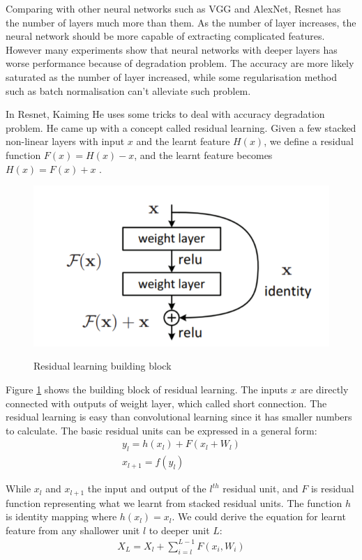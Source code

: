 \documentclass{article}
\begin{document}
Comparing with other neural networks such as VGG and AlexNet, Resnet has the number of layers much more than them. As the number of layer increases, the neural network should be more capable of extracting complicated features. However many experiments show that neural networks with deeper layers has worse performance because of degradation problem. The accuracy are more likely saturated as the number of layer increased, while some regularisation method such as batch normalisation can't alleviate such problem.

In Resnet, Kaiming He uses some tricks to deal with accuracy degradation problem. He came up with a concept called residual learning. Given a few stacked non-linear layers with input $x$ and the learnt feature $H(x)$, we define a residual function $F(x)=H(x)-x$, and the learnt feature becomes $H(x)=F(x)+x$ \citep{ResnetReview}.

\begin{figure}[htp]
    \centering
    \includegraphics[width=\columnwidth]{figures/Residual learning.png}
    \caption{Residual learning building block}
    \label{fig:Residual learning}\citep{Resnet}
\end{figure}

Figure \ref{fig:Residual learning} shows the building block of residual learning. The inputs $x$ are directly connected with outputs of weight layer, which called short connection. The residual learning is easy than convolutional learning since it has smaller numbers to calculate. The basic residual units can be expressed in a general form:
\begin{align}
    y_l=h(x_l)+F(x_l+W_l)\\
    x_{l+1}=f(y_l)
\end{align}

While $x_l$ and $x_{l+1}$ the input and output of the $l^{th}$ residual unit, and $F$ is residual function representing what we learnt from stacked residual units. The function $h$ is identity mapping where $h(x_l)=x_l$. We could derive the equation for learnt feature from any shallower unit $l$ to deeper unit $L$:
\begin{align}
    X_L=X_l+\sum_{i=l}^{L-1}F(x_i,W_i)
\end{align}
\end{document}
